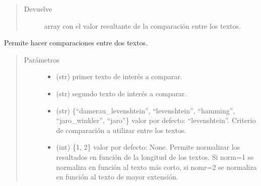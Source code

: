 \documentclass[letterpaper,10pt,openany,spanish]{sphinxmanual}
\begin{document}
\begin{fulllineitems}
\begin{fulllineitems}
\begin{quote}
\begin{description}
\begin{itemize}
\end{itemize}

\item[{Devuelve}] \leavevmode
array con el valor resultante de la comparación entre los 
textos.

\end{description}\end{quote}

\end{fulllineitems}


\begin{fulllineitems}
\label{\detokenize{funciones/comparacion:comparacion.DiferenciaStrings.comparacion_pares}}
Permite hacer comparaciones entre dos textos.
\begin{quote}\begin{description}
\item[{Parámetros}] \leavevmode\begin{itemize}
\item {} 
 \textendash{} (str) primer texto de interés a comparar.

\item {} 
 \textendash{} (str) segundo texto de interés a comparar.

\item {} 
 \textendash{} (str) \{“damerau\_levenshtein”, “levenshtein”, “hamming”, 
“jaro\_winkler”, “jaro”\} valor por defecto: “levenshtein”. 
Criterio de comparación a utilizar entre los textos.

\item {} 
 \textendash{} (int) \{1, 2\} valor por defecto: None. Permite normalizar 
los resultados en función de la longitud de los textos. 
Si norm=1 se normaliza en función al texto más corto, 
si nomr=2 se normaliza en función al texto de mayor extensión.

\end{itemize}


\end{description}
\end{quote}
\end{fulllineitems}
\end{fulllineitems}
\end{document}
